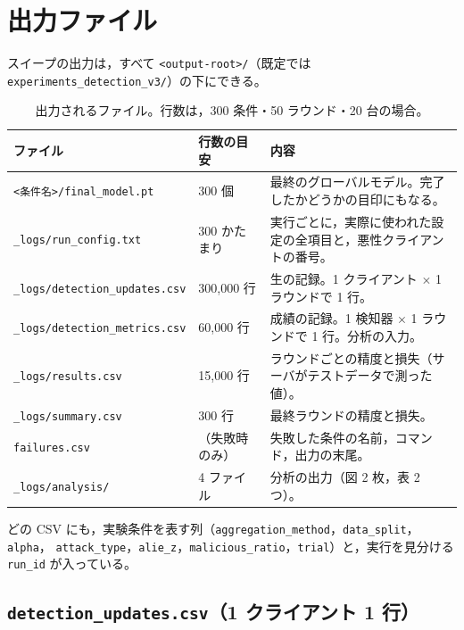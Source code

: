 \documentclass[a4j, dvipdfmx]{jsarticle}  %
\begin{document}
\section{出力ファイル}
\label{sec:output}

スイープの出力は，すべて \texttt{<output-root>/}（既定では \texttt{experiments\_detection\_v3/}）の下にできる。

\begin{table}[H]
\centering
\caption{出力されるファイル。行数は，300 条件・50 ラウンド・20 台の場合。}
\small
\begin{tabular}{@{}P{5.0cm} P{2.4cm} P{7.9cm}@{}}
\toprule
ファイル & 行数の目安 & 内容 \\
\midrule
\texttt{<条件名>/final\_model.pt} & 300 個 & 最終のグローバルモデル。完了したかどうかの目印にもなる。 \\
\texttt{\_logs/run\_config.txt} & 300 かたまり & 実行ごとに，実際に使われた設定の全項目と，悪性クライアントの番号。 \\
\texttt{\_logs/detection\_updates.csv} & 300{,}000 行 & 生の記録。1 クライアント $\times$ 1 ラウンドで 1 行。 \\
\texttt{\_logs/detection\_metrics.csv} & 60{,}000 行 & 成績の記録。1 検知器 $\times$ 1 ラウンドで 1 行。分析の入力。 \\
\texttt{\_logs/results.csv} & 15{,}000 行 & ラウンドごとの精度と損失（サーバがテストデータで測った値）。 \\
\texttt{\_logs/summary.csv} & 300 行 & 最終ラウンドの精度と損失。 \\
\texttt{failures.csv} & （失敗時のみ） & 失敗した条件の名前，コマンド，出力の末尾。 \\
\texttt{\_logs/analysis/} & 4 ファイル & 分析の出力（図 2 枚，表 2 つ）。 \\
\bottomrule
\end{tabular}
\end{table}

どの CSV にも，実験条件を表す列（\texttt{aggregation\_method}，\texttt{data\_split}，\texttt{alpha}，
\texttt{attack\_type}，\texttt{alie\_z}，\texttt{malicious\_ratio}，\texttt{trial}）と，実行を見分ける \texttt{run\_id} が入っている。

\subsection{\texttt{detection\_updates.csv}（1 クライアント 1 行）}
\end{document}

